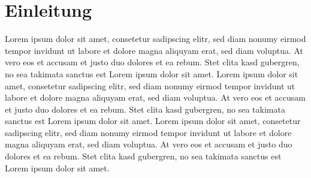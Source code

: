\chapter{Einleitung}
\label{scr:Einleitung}
Lorem ipsum dolor sit amet, consetetur sadipscing elitr, sed diam nonumy eirmod tempor invidunt ut labore et dolore magna aliquyam erat, sed diam voluptua. At vero eos et accusam et justo duo dolores et ea rebum. Stet clita kasd gubergren, no sea takimata sanctus est Lorem ipsum dolor sit amet. Lorem ipsum dolor sit amet, consetetur sadipscing elitr, sed diam nonumy eirmod tempor invidunt ut labore et dolore magna aliquyam erat, sed diam voluptua. At vero eos et accusam et justo duo dolores et ea rebum. Stet clita kasd gubergren, no sea takimata sanctus est Lorem ipsum dolor sit amet. Lorem ipsum dolor sit amet, consetetur sadipscing elitr, sed diam nonumy eirmod tempor invidunt ut labore et dolore magna aliquyam erat, sed diam voluptua. At vero eos et accusam et justo duo dolores et ea rebum. Stet clita kasd gubergren, no sea takimata sanctus est Lorem ipsum dolor sit amet.\\

